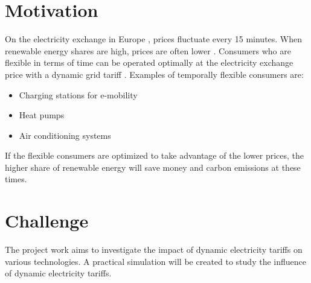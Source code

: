 \documentclass[conference, xcolor=dvipsnames]{IEEEtran}
\begin{document}
	\section{Motivation}
	On the electricity exchange in Europe \cite{r0}, prices fluctuate every 15 minutes. When renewable energy shares are high, prices are often lower \cite{r1}. Consumers who are flexible in terms of time can be operated optimally at the electricity exchange price with a dynamic grid tariff \cite{r2}\cite{r3}. Examples of temporally flexible consumers are:
	\begin{itemize}
		\item Charging stations for e-mobility
		\item Heat pumps
		\item Air conditioning systems
	\end{itemize}
If the flexible consumers are optimized to take advantage of the lower prices, the higher share of renewable energy will save money and carbon emissions at these times.
	
	
	\section{Challenge}
	The project work aims to investigate the impact of dynamic electricity tariffs on various technologies. A practical simulation will be created to study the influence of dynamic electricity tariffs.
	
	
\end{document}
